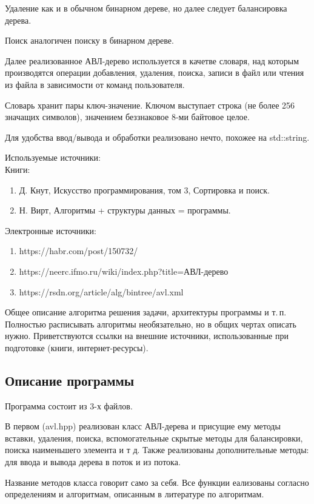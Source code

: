 \documentclass[12pt]{article}
\begin{document}
Удаление как и в обычном бинарном дереве, но далее следует балансировка дерева.

Поиск аналогичен поиску в бинарном дереве.

Далее реализованное АВЛ-дерево используется в качетве словаря, над которым производятся операции добавления, удаления, поиска, записи в файл или чтения из файла в зависимости от команд пользователя.

Словарь хранит пары ключ-значение. Ключом выступает строка (не более 256 значащих символов), значением беззнаковое 8-ми байтовое целое.

Для удобства ввод/вывода и обработки реализовано нечто, похожее на std::string.

Используемые источники:\\
Книги:
\begin{enumerate}
    \item Д. Кнут, Искусство программирования, том 3, Сортировка и поиск.
    \item Н. Вирт, Алгоритмы + структуры данных = программы.
\end{enumerate}
Электронные источники:
\begin{enumerate}
    \item https://habr.com/post/150732/
    \item https://neerc.ifmo.ru/wiki/index.php?title=АВЛ-дерево
    \item https://rsdn.org/article/alg/bintree/avl.xml
\end{enumerate}

Общее описание алгоритма решения задачи, архитектуры программы и
т.\,п. Полностью расписывать алгоритмы необязательно, но в общих чертах
описать нужно. Приветствуются ссылки на внешние источники,
использованные при подготовке (книги, интернет-ресурсы). 

\subsection*{Описание программы}

Программа состоит из 3-х файлов. 

В первом (avl.hpp) реализован класс АВЛ-дерева и присущие ему методы вставки, удаления, поиска, вспомогательные скрытые методы для балансировки, поиска наименьшего элемента и т д. Также реализованы дополнительные методы: для ввода и вывода дерева в поток и из потока.

Название методов класса говорит само за себя. Все функции еализованы согласно определениям и алгоритмам, описанным в литературе по алгоритмам.
 
\end{document}
